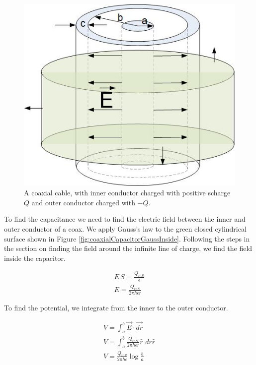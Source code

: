 \documentclass{ximera}
\begin{document}
\begin{figure}[htbp]
\begin{center}
\includegraphics[scale=0.5]{../jpg/coax2.jpg}
\end{center}
\caption{A coaxial cable, with inner conductor charged with positive scharge $Q$ and outer conductor charged with $-Q.$}
\label{fig:coaxialCapacitorGaussOutside}
\end{figure}


 To find the capacitance we need to find the electric field between the inner and outer conductor of a coax. We apply Gauss's law to the green closed cylindrical surface shown in  Figure \ref{fig:coaxialCapacitorGaussInside}. Following the steps in the section on finding the field around the infinite line of charge, we find the field inside the capacitor.
 
 \begin{eqnarray}
 E \, S = \frac{Q_{inS}}{\epsilon} \\
 E=\frac{Q_{inS}}{2 \pi h \epsilon r }
 \end{eqnarray}
 
 To find the potential, we integrate from the inner to the outer conductor.
 
 
 \begin{eqnarray}
 V=\int_a^b \vec{E} \cdot \vec{dr} \\
 V = \int_a^b \frac{Q_{inS}}{2 \pi h \epsilon r } \hat{r} \, \,dr \hat{r} \\
 V=\frac{Q_{inS}}{2 \pi h \epsilon  } \log{\frac{b}{a}}
 \end{eqnarray}
 
\end{document}
